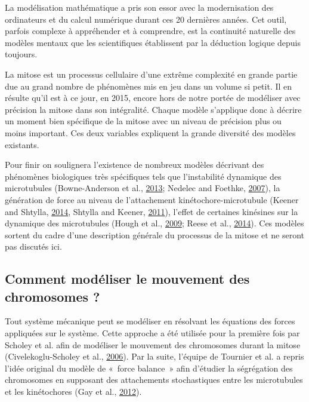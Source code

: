 \documentclass[12pt,a4paper,twoside,openright]{book}
\begin{document}
La modélisation mathématique a pris son essor avec la modernisation des
ordinateurs et du calcul numérique durant ces 20 dernières années. Cet
outil, parfois complexe à appréhender et à comprendre, est la continuité
naturelle des modèles mentaux que les scientifiques établissent par la
déduction logique depuis toujours.

La mitose est un processus cellulaire d'une extrême complexité en grande
partie due au grand nombre de phénomènes mis en jeu dans un volume si
petit. Il en résulte qu'il est à ce jour, en 2015, encore hors de notre
portée de modéliser avec précision la mitose dans son intégralité.
Chaque modèle s'applique donc à décrire un moment bien spécifique de la
mitose avec un niveau de précision plus ou moins important. Ces deux
variables expliquent la grande diversité des modèles existants.

Pour finir on soulignera l'existence de nombreux modèles décrivant des
phénomènes biologiques très spécifiques tels que l'instabilité dynamique
des microtubules (Bowne-Anderson et al.,
\protect\hyperlink{ref-Bowne-Anderson2013}{2013}; Nedelec and Foethke,
\protect\hyperlink{ref-Nedelec2007}{2007}), la génération de force au
niveau de l'attachement kinétochore-microtubule (Keener and Shtylla,
\protect\hyperlink{ref-Keener2014}{2014}, Shtylla and Keener,
\protect\hyperlink{ref-Shtylla2011}{2011}), l'effet de certaines
kinésines sur la dynamique des microtubules (Hough et al.,
\protect\hyperlink{ref-Hough2009}{2009}; Reese et al.,
\protect\hyperlink{ref-Reese2014a}{2014}). Ces modèles sortent du cadre
d'une description générale du processus de la mitose et ne seront pas
discutés ici.

\subsection{Comment modéliser le mouvement des chromosomes
?}\label{comment-moduxe9liser-le-mouvement-des-chromosomes}

Tout système mécanique peut se modéliser en résolvant les équations des
forces appliquées sur le système. Cette approche a été utilisée pour la
première fois par Scholey et al. afin de modéliser le mouvement des
chromosomes durant la mitose (Civelekoglu-Scholey et al.,
\protect\hyperlink{ref-Civelekoglu-Scholey2006}{2006}). Par la suite,
l'équipe de Tournier et al. a repris l'idée original du modèle de
«~force balance~» afin d'étudier la ségrégation des chromosomes en
supposant des attachements stochastiques entre les microtubules et les
kinétochores (Gay et al., \protect\hyperlink{ref-Gay2012a}{2012}).
\end{document}
